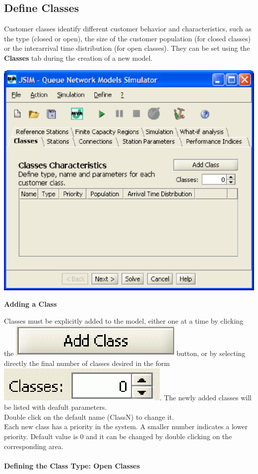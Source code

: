 \subsection{Define Classes}
\label{sec:DefineClasses}
Customer classes identify different customer behavior and characteristics, such as the type (closed or open), the size of the customer population (for closed classes) or the interarrival time distribution (for open classes).
They can be set using the \textbf{Classes} tab during the creation of a new model.\\
\begin{center}
\includegraphics[scale=.5]{img/jsim/define_class1}
\end{center}

\noindent\textbf{\large{Adding a Class}}

Classes must be explicitly added to the model, either one at a time by clicking the \includegraphics[scale=.5]{img/jsim/button_addClass.eps} button, or by selecting directly the final number of classes desired in the form \includegraphics[scale=.5]{img/jsim/button_NClass.eps}. The newly added classes will be listed with deafult parameters.\\
Double click on the default name (ClassN) to change it.\\
Each new class has a priority in the system. A smaller number indicates a lower priority. Default value is 0 and it can be changed by double clicking on the corresponding area.\\\\
\textbf{\large{Defining the Class Type: Open Classes}}

